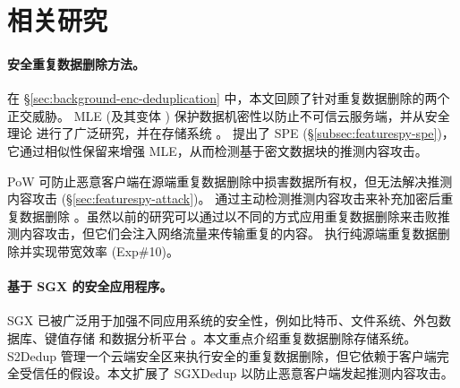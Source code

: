 \section{相关研究}
\label{sec:featurespy-related-work}

\paragraph*{安全重复数据删除方法。}
在 \S\ref{sec:background-enc-deduplication} 中，本文回顾了针对重复数据删除的两个正交威胁。 MLE (及其变体 \cite{bellare2013MLE, bellare2013DupLESS, douceur2002reclaiming, li15}) 保护数据机密性以防止不可信云服务端，并从安全理论 \cite{bellare2015interactive, abadi2013message} 进行了广泛研究，并在存储系统 \cite{cox2002pastiche, adya2002farsite, bellare2013DupLESS, armknecht2015transparent, shah15, li15, li19, qin17, li2020Info, ren21}。 \sysnameF 提出了 SPE (\S\ref{subsec:featurespy-spe})，它通过相似性保留来增强 MLE，从而检测基于密文数据块的推测内容攻击。


PoW 可防止恶意客户端在源端重复数据删除中损害数据所有权，但无法解决推测内容攻击 (\S\ref{sec:featurespy-attack})。 \sysnameF 通过主动检测推测内容攻击来补充加密后重复数据删除 \cite{ren21}。虽然以前的研究可以通过以不同的方式应用重复数据删除来击败推测内容攻击，但它们会注入网络流量来传输重复的内容。 \sysnameF 执行纯源端重复数据删除并实现带宽效率 (Exp\#10)。


\paragraph*{基于 SGX 的安全应用程序。}
SGX 已被广泛用于加强不同应用系统的安全性，例如比特币\cite{matetic19BITE}、文件系统\cite{ahmad2018OBLIVIATE,shinde20}、外包数据库\cite{eskandarian17,priebe18,sun21}、键值存储\cite{mishra2018Oblix,bailleu2019SPEICHER,kim2019ShieldStore,bailleu2021Avocado} 和数据分析平台 \cite{schuster15, zheng2017Opaque, bowe2020ZEXE}。本文重点介绍重复数据删除存储系统。 S2Dedup \cite{miranda2021S2Dedup} 管理一个云端安全区来执行安全的重复数据删除，但它依赖于客户端完全受信任的假设。本文扩展了 SGXDedup \cite{ren21} 以防止恶意客户端发起推测内容攻击。